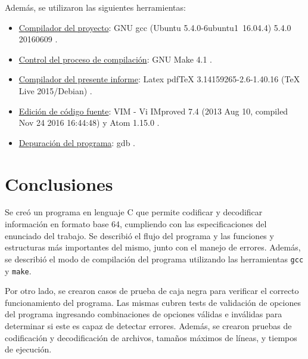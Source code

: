 Además, se utilizaron las siguientes herramientas:
\begin{itemize}
	\item \underline{Compilador del proyecto}: GNU gcc (Ubuntu 5.4.0-6ubuntu1~16.04.4) 5.4.0 20160609 \cite{tool_gcc}.
	\item \underline{Control del proceso de compilación}: GNU Make 4.1 \cite{tool_gnuMake}.
	\item \underline{Compilador del presente informe}: Latex pdfTeX 3.14159265-2.6-1.40.16 (TeX Live 2015/Debian) \cite{tool_latex}.
    \item \underline{Edición de código fuente}: VIM - Vi IMproved 7.4 (2013 Aug 10, compiled Nov 24 2016 16:44:48) y Atom 1.15.0 \cite{tool_vim} \cite{tool_atom}.
	\item \underline{Depuración del programa}: gdb \cite{tool_gdb}.
\end{itemize}

\section{Conclusiones}

Se creó un programa en lenguaje C que permite codificar y decodificar información en formato base 64, cumpliendo con las especificaciones del enunciado del trabajo. Se describió el flujo del programa y las funciones y estructuras más importantes del mismo, junto con el manejo de errores. Además, se describió el modo de compilación del programa utilizando las herramientas \texttt{gcc} y \texttt{make}.

Por otro lado, se crearon casos de prueba de caja negra para verificar el correcto funcionamiento del programa. Las mismas cubren tests de validación de opciones del programa ingresando combinaciones de opciones válidas e inválidas para determinar si este es capaz de detectar errores. Además, se crearon pruebas de codificación y decodificación de archivos, tamaños máximos de líneas, y tiempos de ejecución.

